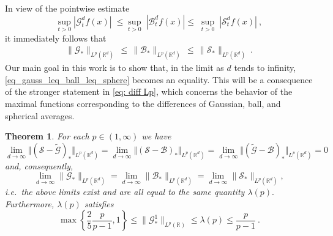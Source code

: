 \documentclass[a4paper, reqno]{amsart}
\newtheorem{thm}{Theorem}[section]
\theoremstyle{definition}
\newcommand{\R}{{\mathbb R}}
\newcommand{\mG}{\mathcal{G}}
\newcommand{\tmG}{\tilde{\mathcal{G}}}
\newcommand{\mB}{\mathcal{B}}
\newcommand{\mS}{\mathcal{S}}
\newcommand{\lm}{\lambda}
\begin{document}
In view of the pointwise estimate 
\begin{equation}
\label{eq: point est}
    \sup_{t>0} |\mG_t^d f(x)| \; \leq \sup_{t>0} \; |\mB_t^df(x)| \leq \; \sup_{t>0} \; |\mS^d_tf(x)| ~, 
\end{equation}
it immediately follows that
\begin{align}\label{eq_gauss_leq_ball_leq_sphere}
   \|\mG_*\|_{L^p(\R^d)} \, \leq \,  \|\mB_*\|_{L^p(\R^d)} \, \leq \,    \|\mS_*\|_{L^p(\R^d)} ~.
\end{align}
Our main goal in this work is to show that, in the limit as $d$ tends to infinity, \eqref{eq_gauss_leq_ball_leq_sphere} becomes an equality. This will be a consequence of the stronger statement in \eqref{eq: diff Lp}, which concerns the behavior of the maximal functions corresponding to the differences of Gaussian, ball, and spherical averages.
\begin{thm}
    \label{thm: limit}
    For each $p\in (1,\infty)$ we have
    \begin{equation}
 \label{eq: diff Lp}
 \lim_{d\to \infty}\Vert  (\mS-\tmG)_*\Vert_{L^p(\mathbb{R}^d)}= \lim_{d\to \infty}\Vert  (\mS-\mB)_*\Vert_{L^p(\mathbb{R}^d)}=\lim_{d\to \infty}\Vert  (\tmG-\mB)_*\Vert_{L^p(\mathbb{R}^d)}=0
 \end{equation}
and, consequently, 
    \begin{equation}
    \label{eq: limno1}
    \lim_{d\to\infty}   \|\mG_*\|_{L^p(\R^d)} =\lim_{d\to\infty}   \|\mB_*\|_{L^p(\R^d)}=\lim_{d\to\infty}   \|\mS_*\|_{L^p(\R^d)},
    \end{equation}
    i.e.\ the above limits exist and are all equal to the same quantity $\lm(p).$ Furthermore,   $\lm(p)$ satisfies  
    \begin{equation}
    \label{eq: lm bounds}
   \max\left\lbrace \frac25 \frac{p}{p-1}, 1 \right\rbrace \le \|\mG_\ast^1\|_{L^p(\mathbb{R})}\le \lm(p)\le \frac{p}{p-1}~.
    \end{equation}
\end{thm}
\end{document}
